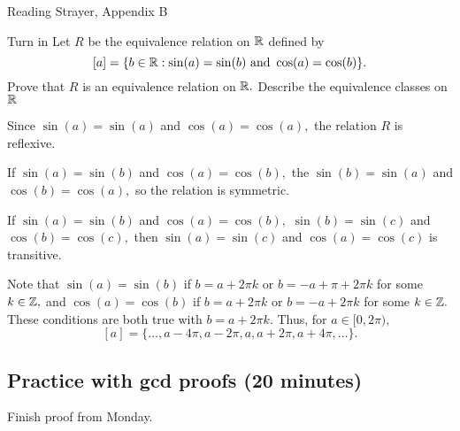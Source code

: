 \documentclass[letterpaper, 11 pt]{ximera}
\begin{document}
\begin{pre}
    \item[Reading] Strayer, Appendix B
    \item[Turn in] Let $R$ be the equivalence relation on $\mathbb R$
    defined by
    \[
   [a]=\{b\in\mathbb R:\sin(a)=\sin(b) \textnormal{ and }\cos(a)=\cos(b)\}.\]
     Prove that $R$ is an equivalence relation on $\mathbb R.$
   Describe the equivalence classes on $\mathbb R$
   
   \begin{solution}
        Since $\sin(a)=\sin(a)$ and $\cos(a)=\cos(a),$ the relation $R$ is reflexive.

        If $\sin(a)=\sin(b)$ and $\cos(a)=\cos(b),$ the $\sin(b)=\sin(a)$ and $\cos(b)=\cos(a),$ so the relation is symmetric.

        If $\sin(a)=\sin(b)$ and $\cos(a)=\cos(b),$ $\sin(b)=\sin(c)$ and $\cos(b)=\cos(c),$ then $\sin(a)=\sin(c)$ and $\cos(a)=\cos(c)$ is transitive.

        Note that $\sin(a)=\sin(b)$ if $b=a+2\pi k$ or $b=-a+\pi+2\pi k$ for some $k\in\mathbb Z,$ and  $\cos(a)=\cos(b)$ if $b=a+2\pi k$ or $b=-a+2\pi k$ for some $k\in\mathbb Z.$ These conditions are both true with $b=a+2\pi k$. Thus, for $a\in[0,2\pi),$
        \[
            [a]=\{\dots,a-4\pi,a-2\pi,a,a+2\pi,a+4\pi,\dots\}.
        \]
       \end{solution}
\end{pre}
\subsection{Practice with gcd proofs (20 minutes)}
Finish proof from Monday.
\end{document}
